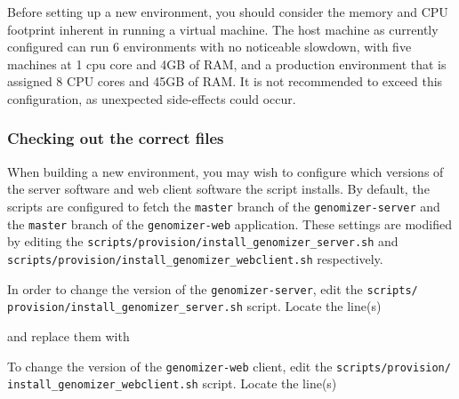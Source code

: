 Before setting up a new environment, you should consider the memory and
CPU footprint inherent in running a virtual machine. The host machine as
currently configured can run 6 environments with no noticeable slowdown,
with five machines at 1 cpu core and 4GB of RAM, and a production
environment that is assigned 8 CPU cores and 45GB of RAM. It is not
recommended to exceed this configuration, as unexpected side-effects
could occur.

\subsubsection{Checking out the correct
files}\label{sec:checking-out-the-correct-files}

When building a new environment, you may wish to configure which
versions of the server software and web client software the script
installs. By default, the scripts are configured to fetch the
\texttt{master} branch of the \texttt{genomizer-server} and the
\texttt{master} branch of the \texttt{genomizer-web} application. These
settings are modified by editing the
\texttt{scripts/provision/install\_genomizer\_server.sh} and
\texttt{scripts/provision/install\_genomizer\_webclient.sh}
respectively.

In order to change the version of the \texttt{genomizer-server}, edit
the \texttt{scripts/
provision/install\_genomizer\_server.sh} script.
Locate the line(s)


\begin{Shaded}
\begin{Highlighting}[numbers=left,,]
 
\end{Highlighting}
\end{Shaded}

and replace them with


\begin{Shaded}
\begin{Highlighting}[numbers=left,,]
 \KeywordTok{<}\KeywordTok{>}
\end{Highlighting}
\end{Shaded}

To change the version of the \texttt{genomizer-web} client, edit the
\texttt{scripts/provision/} \texttt{install\_genomizer\_webclient.sh}
script. Locate the line(s)


